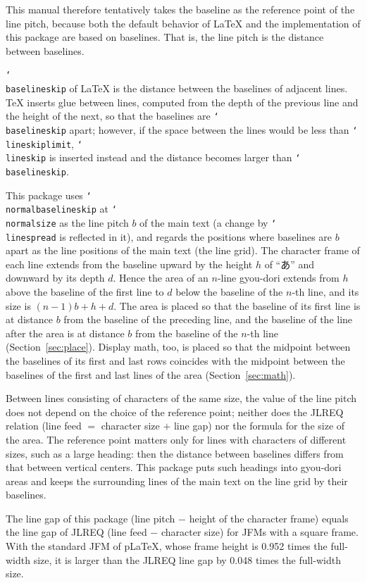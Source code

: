 \documentclass[paper=a4,dvipdfmx]{jlreq}
\newcommand\cs[1]{\texttt{\char`\\#1}}
\begin{document}
This manual therefore tentatively takes the baseline as the reference point of
the line pitch, because both the default behavior of \LaTeX{} and the
implementation of this package are based on baselines. That is, the line pitch
is the distance between baselines.

\cs{baselineskip} of \LaTeX{} is the distance between the baselines of adjacent
lines. \TeX{} inserts glue between lines, computed from the depth of the previous
line and the height of the next, so that the baselines are \cs{baselineskip}
apart; however, if the space between the lines would be less than
\cs{lineskiplimit}, \cs{lineskip} is inserted instead and the distance becomes
larger than \cs{baselineskip}.

This package uses \cs{normalbaselineskip} at \cs{normalsize} as the line pitch
$b$ of the main text (a change by \cs{linespread} is reflected in it), and
regards the positions where baselines are $b$ apart as the line positions of the
main text (the line grid). The character frame of each line extends from the
baseline upward by the height $h$ of ``あ'' and downward by its depth $d$. Hence
the area of an $n$-line gyou-dori extends from $h$ above the baseline of the first
line to $d$ below the baseline of the $n$-th line, and its size is $(n-1)b+h+d$.
The area is placed so that the baseline of its first line is at distance $b$ from
the baseline of the preceding line, and the baseline of the line after the area
is at distance $b$ from the baseline of the $n$-th line
(Section~\ref{sec:place}). Display math, too, is placed so that the midpoint
between the baselines of its first and last rows coincides with the midpoint
between the baselines of the first and last lines of the area
(Section~\ref{sec:math}).

Between lines consisting of characters of the same size, the value of the line
pitch does not depend on the choice of the reference point; neither does the
JLREQ relation (line feed $=$ character size $+$ line gap) nor the formula for
the size of the area. The reference point matters only for lines with
characters of different sizes, such as a large heading: then the distance
between baselines differs from that between vertical centers. This package puts
such headings into gyou-dori areas and keeps the surrounding lines of the main
text on the line grid by their baselines.

The line gap of this package (line pitch $-$ height of the character frame)
equals the line gap of JLREQ (line feed $-$ character size) for JFMs with a
square frame. With the standard JFM of pLaTeX, whose frame height is 0.952 times
the full-width size, it is larger than the JLREQ line gap by 0.048 times the
full-width size.
\end{document}
